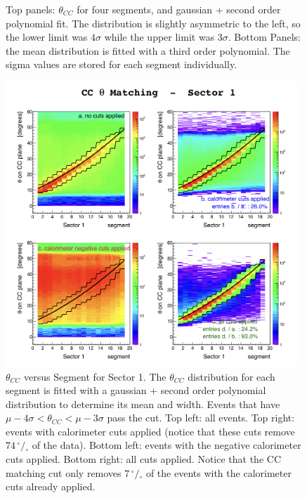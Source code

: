 \begin{figure}[h]
		\caption{Top panels: $\theta_{CC}$ for four segments, and gaussian + second order
					polynomial fit. The distribution is slightly asymmetric to the
               left, so the lower limit was $4\sigma$ while the upper limit
               was $3\sigma$.
               Bottom Panels: the mean distribution is fitted with a third order
               polynomial. The sigma values are stored for each segment individually. }
 		\label{fig:ccm_slices}
\end{figure}


\begin{figure}[h]
  \centering
		\includegraphics[width=0.98\textwidth]{img/cut-01ccthmd_sector-1.png}
		\caption{$\theta_{CC}$ versus Segment for Sector 1. The $\theta_{CC}$
               distribution for each segment is fitted with a gaussian +
               second order polynomial distribution to determine its mean
               and width. Events that have $\mu - 4\sigma < \theta_{CC} < \mu - 3\sigma$
               pass the cut.
               Top left: all events. Top right: events with calorimeter cuts applied
               (notice that these cuts remove $74 \,^{\circ\!\!}/\!_\circ$ of the data).
               Bottom left: events with the negative calorimeter cuts applied.
               Bottom right: all cuts applied. Notice that the CC matching cut
               only removes $7  \,^{\circ\!\!}/\!_\circ$ of the events with
               the calorimeter cuts already applied.}
 		\label{fig:ccm_theta}
\end{figure}

